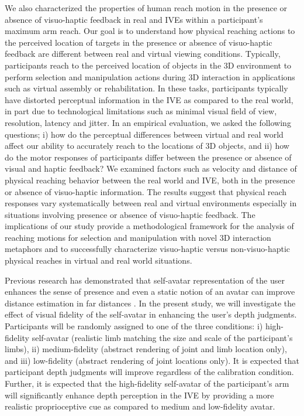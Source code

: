 We also characterized the properties of human reach motion in the presence or absence of visuo-haptic feedback in real and IVEs within a participant's maximum arm reach. Our goal is to understand how physical reaching actions to the perceived location of targets in the presence or absence of visuo-haptic feedback are different between real and virtual viewing conditions. Typically, participants reach to the perceived location of objects in the 3D environment to perform selection and manipulation actions during 3D interaction in applications such as virtual assembly or rehabilitation. In these tasks, participants typically have distorted perceptual information in the IVE as compared to the real world, in part due to technological limitations such as minimal visual field of view, resolution, latency and jitter. In an empirical evaluation, we asked the following questions; i) how do the perceptual differences between virtual and real world affect our ability to accurately reach to the locations of 3D objects, and ii) how do the motor responses of participants differ between the presence or absence of visual and haptic feedback? We examined factors such as velocity and distance of physical reaching behavior between the real world and IVE, both in the presence or absence of visuo-haptic information. The results suggest that physical reach responses vary systematically between real and virtual environments especially in situations involving presence or absence of visuo-haptic feedback. The implications of our study provide a methodological framework for the analysis of reaching motions for selection and manipulation with novel 3D interaction metaphors and to successfully characterize visuo-haptic versus non-visuo-haptic physical reaches in virtual and real world situations.

Previous research has demonstrated that self-avatar representation of the user enhances the sense of presence \cite{LNW+03} and even a static notion of an avatar can improve distance estimation in far distances \cite{RIK+08,MCW+10}. In the present study, we will investigate the effect of visual fidelity of the self-avatar in enhancing the user's depth judgments. Participants will be randomly assigned to one of the three conditions: i) high-fidelity self-avatar (realistic limb matching the size and scale of the participant’s limbs), ii) medium-fidelity (abstract rendering of joint and limb location only), and iii) low-fidelity (abstract rendering of joint locations only). It is expected that participant depth judgments will improve regardless of the calibration condition. Further, it is expected that the high-fidelity self-avatar of the participant’s arm will significantly enhance depth perception in the IVE by providing a more realistic proprioceptive cue as compared to medium and low-fidelity avatar. 






